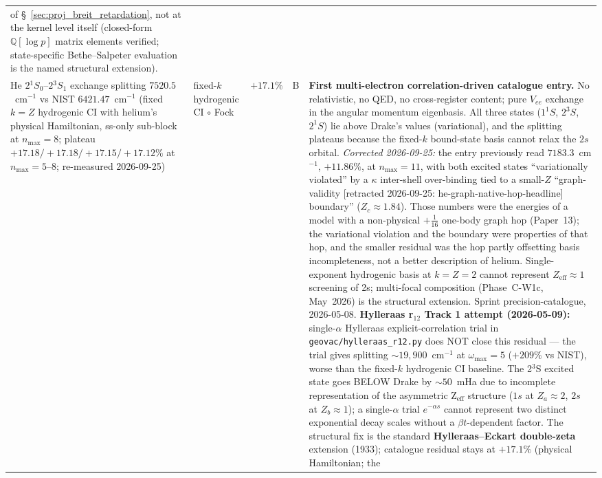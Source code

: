 \documentclass[11pt]{article}
\begin{document}
{\begin{longtable}{p{3.8cm} p{2.5cm} p{1.5cm} p{1.4cm} p{4.5cm}}
of \S~\ref{sec:proj_breit_retardation}, not at the kernel level itself
(closed-form $\mathbb{Q}[\log p]$ matrix elements verified;
state-specific Bethe--Salpeter evaluation is the named structural
extension). \\
He $2{}^1S_0$--$2{}^3S_1$ exchange splitting $7520.5$~cm$^{-1}$ vs NIST
$6421.47$~cm$^{-1}$ (fixed $k = Z$ hydrogenic CI with helium's physical
Hamiltonian, ss-only sub-block at $n_\text{max}=8$; plateau
$+17.18/+17.18/+17.15/+17.12\%$ at $n_\text{max}=5$--$8$; re-measured
2026-09-25) &
fixed-$k$ hydrogenic CI $\circ$ Fock &
$+17.1\%$ & B & \textbf{First multi-electron correlation-driven catalogue
entry.}  No relativistic, no QED, no cross-register content; pure $V_{ee}$
exchange in the angular momentum eigenbasis.  All three states
($1^1S$, $2^3S$, $2^1S$) lie above Drake's values (variational), and
the splitting plateaus because the fixed-$k$ bound-state basis cannot
relax the $2s$ orbital.  \emph{Corrected 2026-09-25:} the entry
previously read $7183.3$~cm$^{-1}$, $+11.86\%$, at $n_\text{max}=11$,
with both excited states ``variationally violated'' by a $\kappa$
inter-shell over-binding tied to a small-$Z$ ``graph-validity [retracted 2026-09-25: he-graph-native-hop-headline]
boundary'' ($Z_c \approx 1.84$).  Those numbers were the energies of a
model with a non-physical $+\tfrac{1}{16}$ one-body graph hop (Paper~13);
the variational violation and the boundary were properties of that hop,
and the smaller residual was the hop partly offsetting basis
incompleteness, not a better description of helium.
Single-exponent hydrogenic basis at $k = Z = 2$ cannot represent
$Z_\text{eff} \approx 1$ screening of 2s; multi-focal composition
(Phase~C-W1c, May~2026) is the structural extension.  Sprint
precision-catalogue, 2026-05-08.
\textbf{Hylleraas r$_{12}$ Track 1 attempt (2026-05-09):} single-$\alpha$
Hylleraas explicit-correlation trial in
\texttt{geovac/hylleraas\_r12.py} does NOT close this residual --- the
trial gives splitting $\sim 19{,}900$~cm$^{-1}$ at $\omega_{\max}=5$
($+209\%$ vs NIST), worse than the fixed-$k$ hydrogenic CI baseline.  The
2$^3$S excited state goes BELOW Drake by $\sim 50$~mHa due to incomplete
representation of the asymmetric Z$_\text{eff}$ structure
($1s$ at $Z_a\!\approx\!2$, $2s$ at $Z_b\!\approx\!1$); a single-$\alpha$
trial $e^{-\alpha s}$ cannot represent two distinct exponential decay
scales without a $\beta t$-dependent factor.  The structural fix is
the standard \textbf{Hylleraas--Eckart double-zeta} extension (1933);
catalogue residual stays at $+17.1\%$ (physical Hamiltonian; the

\end{longtable}}
\end{document}

